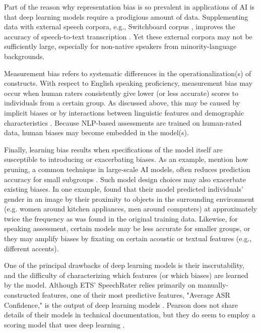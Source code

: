\documentclass [PhD] {uclathes}
\begin{document}
Part of the reason why representation bias is so prevalent in applications of AI is that deep learning models require a prodigious amount of data. Supplementing data with external speech corpora, e.g., Switchboard corpus \citep{godfrey1997switchboard}, improves the accuracy of speech-to-text transcription \citep{qian2019automatic}. Yet these external corpora may not be sufficiently large, especially for non-native speakers from minority-language backgrounds.

Measurement bias refers to systematic differences in the operationalization(s) of constructs. With respect to English speaking proficiency, measurement bias may occur when human raters consistently give lower (or less accurate) scores to individuals from a certain group. As discussed above, this may be caused by implicit biases \citep{spencer2016} or by interactions between linguistic features and demographic characteristics \citep{zhang2019assessing}. Because NLP-based assessments are trained on human-rated data, human biases may become embedded in the model(s).

Finally, learning bias results when specifications of the model itself are susceptible to introducing or exacerbating biases. As an example, \citet{suresh2021framework} mention how pruning, a common technique in large-scale AI models, often reduces prediction accuracy for small subgroups \citep{hooker2020characterising}. Such model design choices may also exacerbate existing biases. In one example, \citet{zhao2017men} found that their model predicted individuals' gender in an image by their proximity to objects in the surrounding environment (e.g. women around kitchen appliances, men around computers) at approximately twice the frequency as was found in the original training data. Likewise, for speaking assessment, certain models may be less accurate for smaller groups, or they may amplify biases by fixating on certain acoustic or textual features (e.g., different accents).

One of the principal drawbacks of deep learning models is their inscrutability, and the difficulty of characterizing which features (or which biases) are learned by the model. Although ETS' SpeechRater relies primarily on manually-constructed features, one of their most predictive features, "Average ASR Confidence," is the output of deep learning models \citep{qian2019automatic}. Pearson does not share details of their models in technical documentation, but they do seem to employ a scoring model that uses deep learning \citep{cheng2014automatic}.
\end{document}
